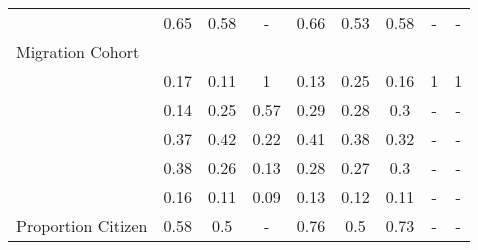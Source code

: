 \begin{table}[ht]
\begin{tabular}{>{\raggedright\arraybackslash}p{3cm}|cccccccc}
  \multicolumn{1}{>{\raggedleft\arraybackslash}p{3cm}|}{\makebox[3cm][r]{15 - 49 }}& 0.65 & 0.58 & - & 0.66 & 0.53 & 0.58 & - & - \\ 
  Migration Cohort &  &  &  &  &  &  &  &  \\ 
  \multicolumn{1}{>{\raggedleft\arraybackslash}p{3cm}|}{\makebox[3cm][r]{Greater than 50 }}& 0.17 & 0.11 & 1 & 0.13 & 0.25 & 0.16 & 1 & 1 \\ 
  \multicolumn{1}{>{\raggedleft\arraybackslash}p{3cm}|}{\makebox[3cm][r]{Before 1965 }}& 0.14 & 0.25 & 0.57 & 0.29 & 0.28 & 0.3 & - & - \\ 
  \multicolumn{1}{>{\raggedleft\arraybackslash}p{3cm}|}{\makebox[3cm][r]{1965 - 1979 }}& 0.37 & 0.42 & 0.22 & 0.41 & 0.38 & 0.32 & - & - \\ 
  \multicolumn{1}{>{\raggedleft\arraybackslash}p{3cm}|}{\makebox[3cm][r]{1980 - 1999 }}& 0.38 & 0.26 & 0.13 & 0.28 & 0.27 & 0.3 & - & - \\ 
  \multicolumn{1}{>{\raggedleft\arraybackslash}p{3cm}|}{\makebox[3cm][r]{After 2000 }}& 0.16 & 0.11 & 0.09 & 0.13 & 0.12 & 0.11 & - & - \\ 
  Proportion Citizen & 0.58 & 0.5 & - & 0.76 & 0.5 & 0.73 & - & - \\ 
   \hline
\end{tabular}
\endgroup
\end{table}
